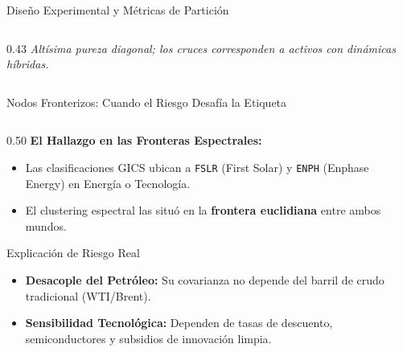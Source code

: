 \documentclass[aspectratio=169, 10pt]{beamer}
\begin{document}
\begin{frame}{Diseño Experimental y Métricas de Partición}
\begin{columns}[T]
\begin{column}{0.43\textwidth}
			\vspace{0.1cm}
			\small\textit{Altísima pureza diagonal; los cruces corresponden a activos con dinámicas híbridas.}
		\end{column}
	\end{columns}

\end{frame}
	
	\begin{frame}{Nodos Fronterizos: Cuando el Riesgo Desafía la Etiqueta}
		\begin{columns}[c]
			\begin{column}{0.50\textwidth}
				\textbf{El Hallazgo en las Fronteras Espectrales:}
				\begin{itemize}
					\item Las clasificaciones GICS ubican a \texttt{FSLR} (First Solar) y \texttt{ENPH} (Enphase Energy) en Energía o Tecnología.
					\item El clustering espectral las situó en la \textbf{frontera euclidiana} entre ambos mundos.
				\end{itemize}
				\vspace{0.2cm}
				\begin{block}{Explicación de Riesgo Real}
					\begin{itemize}
						\item \textbf{Desacople del Petróleo:} Su covarianza no depende del barril de crudo tradicional (WTI/Brent).
						\item \textbf{Sensibilidad Tecnológica:} Dependen de tasas de descuento, semiconductores y subsidios de innovación limpia.
					\end{itemize}
				\end{block}
			\end{column}
			


\end{columns}
\end{frame}
\end{document}
